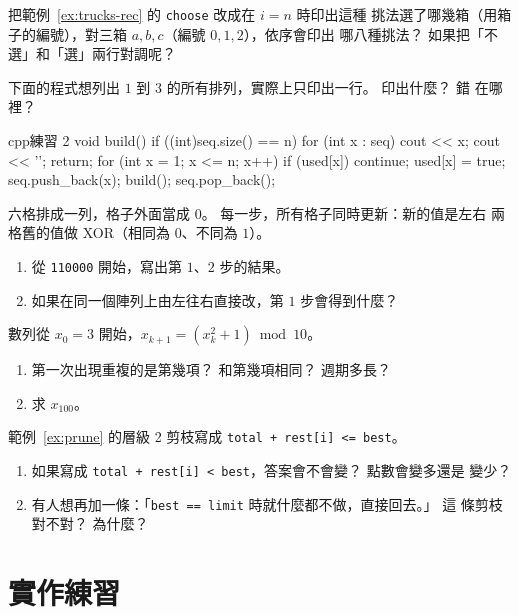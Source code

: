 \begin{drills}[label=drills:ch4]
\item 把範例~\ref{ex:trucks-rec} 的 \texttt{choose} 改成在 $i = n$ 時印出這種
挑法選了哪幾箱（用箱子的編號），對三箱 $a, b, c$（編號 $0, 1, 2$），依序會印出
哪八種挑法？ 如果把「不選」和「選」兩行對調呢？

\item 下面的程式想列出 $1$ 到 $3$ 的所有排列，實際上只印出一行。 印出什麼？ 錯
在哪裡？
\begin{code}{cpp}{練習 2}
void build() {
    if ((int)seq.size() == n) {
        for (int x : seq) {
            cout << x;
        }
        cout << '\n';
        return;
    }
    for (int x = 1; x <= n; x++) {
        if (used[x]) {
            continue;
        }
        used[x] = true;
        seq.push_back(x);
        build();
        seq.pop_back();
    }
}
\end{code}

\item 六格排成一列，格子外面當成 $0$。 每一步，所有格子同時更新：新的值是左右
兩格舊的值做 XOR（相同為 $0$、不同為 $1$）。
\begin{enumerate}
\item 從 \texttt{110000} 開始，寫出第 $1$、$2$ 步的結果。
\item 如果在同一個陣列上由左往右直接改，第 $1$ 步會得到什麼？
\end{enumerate}

\item 數列從 $x_0 = 3$ 開始，$x_{k+1} = (x_k^2 + 1) \bmod 10$。
\begin{enumerate}
\item 第一次出現重複的是第幾項？ 和第幾項相同？ 週期多長？
\item 求 $x_{100}$。
\end{enumerate}

\item 範例~\ref{ex:prune} 的層級 2 剪枝寫成 \texttt{total + rest[i] <= best}。
\begin{enumerate}
\item 如果寫成 \texttt{total + rest[i] < best}，答案會不會變？ 點數會變多還是
變少？
\item 有人想再加一條：「\texttt{best == limit} 時就什麼都不做，直接回去。」 這
條剪枝對不對？ 為什麼？
\end{enumerate}
\end{drills}

\section{實作練習}
\label{sec:ch4-practice}

